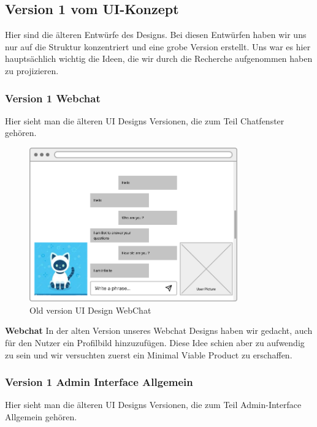 \subsection{Version 1 vom UI-Konzept}

Hier sind die älteren Entwürfe des Designs. Bei diesen Entwürfen haben wir uns nur auf die Struktur
konzentriert und eine grobe Version erstellt. Uns war es hier hauptsächlich wichtig
die Ideen, die wir durch die Recherche aufgenommen haben zu projizieren.
\\

\subsubsection{Version 1 Webchat}
Hier sieht man die älteren UI Designs Versionen, die zum Teil Chatfenster gehören.

\begin{figure}[H]
    \centering
    \includegraphics[width=0.8\textwidth]{bilder/old vers. UI Design/WebChat.png}
    \caption{Old version UI Design WebChat}
    \label{fig:Old version UI Design WebChat}
    \end{figure}
\noindent \textbf{Webchat} \newline
In der alten Version unseres Webchat Designs haben wir gedacht, auch für den
Nutzer ein Profilbild hinzuzufügen. Diese Idee schien aber zu aufwendig zu sein und wir versuchten
zuerst ein Minimal Viable Product zu erschaffen.                                                     

\newpage

\subsubsection{Version 1 Admin Interface Allgemein}
Hier sieht man die älteren UI Designs Versionen, die zum Teil Admin-Interface Allgemein gehören.

